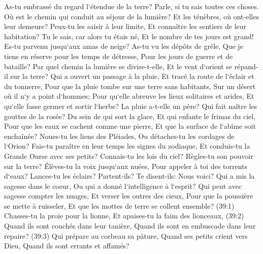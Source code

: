 \verse As-tu embrassé du regard l`étendue de la terre? Parle, si tu sais toutes ces choses. 
\verse Où est le chemin qui conduit au séjour de la lumière? Et les ténèbres, où ont-elles leur demeure? 
\verse Peux-tu les saisir à leur limite, Et connaître les sentiers de leur habitation? 
\verse Tu le sais, car alors tu étais né, Et le nombre de tes jours est grand! 
\verse Es-tu parvenu jusqu`aux amas de neige? As-tu vu les dépôts de grêle, 
\verse Que je tiens en réserve pour les temps de détresse, Pour les jours de guerre et de bataille? 
\verse Par quel chemin la lumière se divise-t-elle, Et le vent d`orient se répand-il sur la terre? 
\verse Qui a ouvert un passage à la pluie, Et tracé la route de l`éclair et du tonnerre, 
\verse Pour que la pluie tombe sur une terre sans habitants, Sur un désert où il n`y a point d`hommes; 
\verse Pour qu`elle abreuve les lieux solitaires et arides, Et qu`elle fasse germer et sortir l`herbe? 
\verse La pluie a-t-elle un père? Qui fait naître les gouttes de la rosée? 
\verse Du sein de qui sort la glace, Et qui enfante le frimas du ciel, 
\verse Pour que les eaux se cachent comme une pierre, Et que la surface de l`abîme soit enchaînée? 
\verse Noues-tu les liens des Pléiades, Ou détaches-tu les cordages de l`Orion? 
\verse Fais-tu paraître en leur temps les signes du zodiaque, Et conduis-tu la Grande Ourse avec ses petits? 
\verse Connais-tu les lois du ciel? Règles-tu son pouvoir sur la terre? 
\verse Élèves-tu la voix jusqu`aux nuées, Pour appeler à toi des torrents d`eaux? 
\verse Lances-tu les éclairs? Partent-ils? Te disent-ils: Nous voici? 
\verse Qui a mis la sagesse dans le coeur, Ou qui a donné l`intelligence à l`esprit? 
\verse Qui peut avec sagesse compter les nuages, Et verser les outres des cieux, 
\verse Pour que la poussière se mette à ruisseler, Et que les mottes de terre se collent ensemble? 
\verse (39:1) Chasses-tu la proie pour la lionne, Et apaises-tu la faim des lionceaux, 
\verse (39:2) Quand ils sont couchés dans leur tanière, Quand ils sont en embuscade dans leur repaire? 
\verse (39:3) Qui prépare au corbeau sa pâture, Quand ses petits crient vers Dieu, Quand ils sont errants et affamés? 


